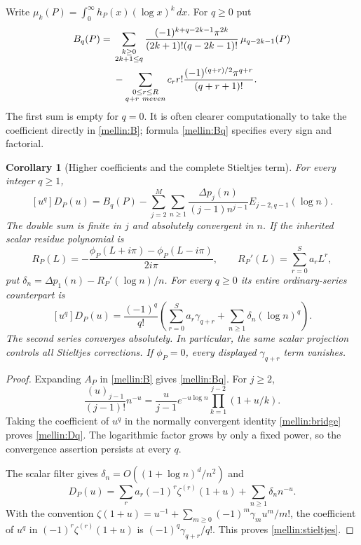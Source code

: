 \documentclass[11pt,letterpaper]{article}
\newtheorem{corollary}[theorem]{Corollary}
\theoremstyle{definition}
\theoremstyle{remark}
\numberwithin{equation}{section}
\begin{document}
Write $\mu_k(P)=\int_0^\infty h_P(x)(\log x)^k\,dx$.
For $q\ge0$ put
\begin{align}
 B_q(P)={}&
 \sum_{\substack{k\ge0\\2k+1\le q}}
 \frac{(-1)^{k+q-2k-1}\pi^{2k}}
 {(2k+1)!(q-2k-1)!}\,\mu_{q-2k-1}(P)\notag\\
 &-\sum_{\substack{0\le r\le R\\q+r\ {
m even}}}
 c_r r!\frac{(-1)^{(q+r)/2}\pi^{q+r}}{(q+r+1)!}.
 \label{mellin:Bq}
\end{align}
The first sum is empty for $q=0$.  It is often clearer computationally
to take the coefficient directly in \eqref{mellin:B}; formula
\eqref{mellin:Bq} specifies every sign and factorial.

\begin{corollary}[Higher coefficients and the complete Stieltjes term]
\label{mellin:coefficients}
For every integer $q\ge1$,
\begin{equation}\label{mellin:Dq}
 \boxed{[u^q]D_P(u)=B_q(P)-
 \sum_{j=2}^{M}\sum_{n\ge1}
 \frac{\Delta p_j(n)}{(j-1)n^{j-1}}
 E_{j-2,q-1}(\log n).}
\end{equation}
The double sum is finite in $j$ and absolutely convergent in $n$.
If the inherited scalar residue polynomial is
\[
 R_P(L)=-\frac{\phi_P(L+i\pi)-\phi_P(L-i\pi)}{2i\pi},
 \qquad R_P'(L)=\sum_{r=0}^{S}a_rL^r,
\]
put
$\delta_n=\Delta p_1(n)-R_P'(\log n)/n$.
For every $q\ge0$ its entire ordinary-series counterpart is
\begin{equation}\label{mellin:stieltjes}
 \boxed{[u^q]D_P(u)=\frac{(-1)^q}{q!}
 \left(\sum_{r=0}^{S}a_r\gamma_{q+r}
                  +\sum_{n\ge1}\delta_n(\log n)^q\right).}
\end{equation}
The second series converges absolutely.  In particular, the same
scalar projection controls \emph{all} Stieltjes corrections.  If
$\phi_P=0$, every displayed $\gamma_{q+r}$ term vanishes.
\end{corollary}

\begin{proof}
Expanding $A_P$ in \eqref{mellin:B} gives \eqref{mellin:Bq}.
For $j\ge2$,
\[
 \frac{(u)_{j-1}}{(j-1)!}n^{-u}
 =\frac{u}{j-1}e^{-u\log n}\prod_{k=1}^{j-2}(1+u/k).
\]
Taking the coefficient of $u^q$ in the normally convergent identity
\eqref{mellin:bridge} proves \eqref{mellin:Dq}.  The logarithmic
factor grows by only a fixed power, so the convergence assertion
persists at every $q$.

The scalar filter gives
$\delta_n=O((1+\log n)^d/n^2)$ and
\[
 D_P(u)=\sum_r a_r(-1)^r\zeta^{(r)}(1+u)
                         +\sum_{n\ge1}\delta_nn^{-u}.
\]
With the convention
$\zeta(1+u)=u^{-1}+\sum_{m\ge0}(-1)^m\gamma_m u^m/m!$,
the coefficient of $u^q$ in
$(-1)^r\zeta^{(r)}(1+u)$ is
$(-1)^q\gamma_{q+r}/q!$.  This proves \eqref{mellin:stieltjes}.
\end{proof}
\end{document}
